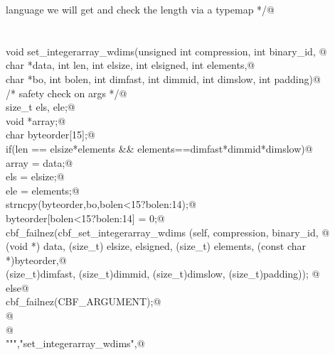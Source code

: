 \documentclass[10pt,a4paper,twoside,notitlepage]{article}
\begin{document}
\begin{flushleft}
\begin{minipage}{\linewidth}
\begin{list}{}{}
\mbox{}\verb@       language we will get and check the length via a typemap */@\\
\mbox{}\verb@@\\
\mbox{}\verb@%apply (char *STRING, int LENGTH) { (char *data, int len) } set_integerarray_wdims;@\\
\mbox{}\verb@%apply (char *STRING, int LENGTH) { (char *bo, int bolen) } set_integerarray_wdims;@\\
\mbox{}\verb@@\\
\mbox{}\verb@    void set_integerarray_wdims(unsigned int compression, int binary_id, @\\
\mbox{}\verb@             char *data, int len, int elsize, int elsigned, int elements,@\\
\mbox{}\verb@             char *bo, int bolen, int dimfast, int dimmid, int dimslow, int padding){@\\
\mbox{}\verb@        /* safety check on args */@\\
\mbox{}\verb@        size_t els, ele;@\\
\mbox{}\verb@        void *array;@\\
\mbox{}\verb@        char byteorder[15];@\\
\mbox{}\verb@        if(len == elsize*elements && elements==dimfast*dimmid*dimslow){@\\
\mbox{}\verb@           array = data;@\\
\mbox{}\verb@           els = elsize;@\\
\mbox{}\verb@           ele = elements;@\\
\mbox{}\verb@           strncpy(byteorder,bo,bolen<15?bolen:14);@\\
\mbox{}\verb@           byteorder[bolen<15?bolen:14] = 0;@\\
\mbox{}\verb@           cbf_failnez(cbf_set_integerarray_wdims (self, compression, binary_id, @\\
\mbox{}\verb@           (void *) data,  (size_t) elsize, elsigned, (size_t) elements, (const char *)byteorder,@\\
\mbox{}\verb@           (size_t)dimfast, (size_t)dimmid, (size_t)dimslow, (size_t)padding)); @\\
\mbox{}\verb@        }else{@\\
\mbox{}\verb@           cbf_failnez(CBF_ARGUMENT);@\\
\mbox{}\verb@        }@\\
\mbox{}\verb@    }@\\
\mbox{}\verb@""","set_integerarray_wdims",@\\

\end{list}
\end{minipage}
\end{flushleft}
\end{document}

